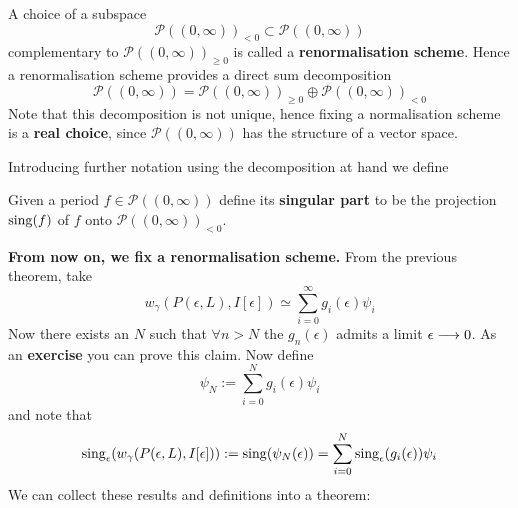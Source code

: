 \begin{definition}
  A choice of a subspace
  \begin{equation}\mathcal{P}((0,\infty))_{< 0} \subset \mathcal{P}((0,\infty)) \end{equation}
  complementary to $\mathcal{P}((0,\infty))_{\geq 0}$ is called a \textbf{renormalisation scheme}. Hence a renormalisation scheme provides a direct sum decomposition
  \begin{equation}\mathcal{P}((0,\infty)) = \mathcal{P}((0,\infty))_{\geq 0} \oplus \mathcal{P}((0,\infty))_{< 0}\end{equation}
  Note that this decomposition is not unique, hence fixing a normalisation scheme is a \textbf{real choice}, since $\mathcal{P}((0,\infty))$ has the structure of a vector space.
\end{definition}

Introducing further notation using the decomposition at hand we define

\begin{definition}
  Given a period $f \in \mathcal{P}((0,\infty))$ define its \textbf{singular part} to be the projection $\operatorname{sing}(f)$ of $f$ onto $\mathcal{P}((0,\infty))_{< 0}$.
\end{definition}

\textbf{From now on, we fix a renormalisation scheme.} From the previous theorem, take
\begin{equation} w_\gamma (P(\epsilon,L), I[\epsilon]) \simeq \sum_{i=0}^{\infty} g_i(\epsilon) \psi_i\end{equation}
Now there exists an $N$ such that $\forall n > N$ the $g_n(\epsilon)$ admits a limit $\epsilon \lra 0$. As an \textbf{exercise} you can prove this claim. Now define
\begin{equation} \psi_N := \sum_{i=0}^N g_i(\epsilon) \psi_i\end{equation}
and note that
\begin{equation} \sing_\epsilon (w_\gamma(P(\epsilon,L), I[\epsilon])) := \sing( \psi_N(\epsilon)) = \sum_{i=0}^N \sing_\epsilon(g_i(\epsilon)) \psi_i\end{equation}
We can collect these results and definitions into a theorem:


